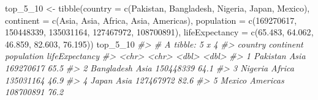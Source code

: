 \documentclass[
]{book}
\newenvironment{Shaded}{\begin{snugshade}}{\end{snugshade}}
\newcommand{\AttributeTok}[1]{\textcolor[rgb]{0.77,0.63,0.00}{#1}}
\newcommand{\CommentTok}[1]{\textcolor[rgb]{0.56,0.35,0.01}{\textit{#1}}}
\newcommand{\DecValTok}[1]{\textcolor[rgb]{0.00,0.00,0.81}{#1}}
\newcommand{\FloatTok}[1]{\textcolor[rgb]{0.00,0.00,0.81}{#1}}
\newcommand{\FunctionTok}[1]{\textcolor[rgb]{0.00,0.00,0.00}{#1}}
\newcommand{\NormalTok}[1]{#1}
\newcommand{\OtherTok}[1]{\textcolor[rgb]{0.56,0.35,0.01}{#1}}
\newcommand{\StringTok}[1]{\textcolor[rgb]{0.31,0.60,0.02}{#1}}
\begin{document}
\begin{Shaded}
\begin{Highlighting}[]
\NormalTok{top\_5\_10 }\OtherTok{\textless{}{-}} \FunctionTok{tibble}\NormalTok{(}\AttributeTok{country =} \FunctionTok{c}\NormalTok{(}\StringTok{\textquotesingle{}Pakistan\textquotesingle{}}\NormalTok{, }\StringTok{\textquotesingle{}Bangladesh\textquotesingle{}}\NormalTok{, }\StringTok{\textquotesingle{}Nigeria\textquotesingle{}}\NormalTok{, }\StringTok{\textquotesingle{}Japan\textquotesingle{}}\NormalTok{, }\StringTok{\textquotesingle{}Mexico\textquotesingle{}}\NormalTok{),}
                   \AttributeTok{continent =} \FunctionTok{c}\NormalTok{(}\StringTok{\textquotesingle{}Asia\textquotesingle{}}\NormalTok{, }\StringTok{\textquotesingle{}Asia\textquotesingle{}}\NormalTok{, }\StringTok{\textquotesingle{}Africa\textquotesingle{}}\NormalTok{, }\StringTok{\textquotesingle{}Asia\textquotesingle{}}\NormalTok{, }\StringTok{\textquotesingle{}Americas\textquotesingle{}}\NormalTok{),}
                   \AttributeTok{population =} \FunctionTok{c}\NormalTok{(}\DecValTok{169270617}\NormalTok{, }\DecValTok{150448339}\NormalTok{, }\DecValTok{135031164}\NormalTok{, }\DecValTok{127467972}\NormalTok{, }\DecValTok{108700891}\NormalTok{),}
                   \AttributeTok{lifeExpectancy =} \FunctionTok{c}\NormalTok{(}\FloatTok{65.483}\NormalTok{, }\FloatTok{64.062}\NormalTok{, }\FloatTok{46.859}\NormalTok{, }\FloatTok{82.603}\NormalTok{, }\FloatTok{76.195}\NormalTok{))}
\NormalTok{top\_5\_10}
\CommentTok{\#\textgreater{} \# A tibble: 5 x 4}
\CommentTok{\#\textgreater{}   country    continent population lifeExpectancy}
\CommentTok{\#\textgreater{}   \textless{}chr\textgreater{}      \textless{}chr\textgreater{}          \textless{}dbl\textgreater{}          \textless{}dbl\textgreater{}}
\CommentTok{\#\textgreater{} 1 Pakistan   Asia       169270617           65.5}
\CommentTok{\#\textgreater{} 2 Bangladesh Asia       150448339           64.1}
\CommentTok{\#\textgreater{} 3 Nigeria    Africa     135031164           46.9}
\CommentTok{\#\textgreater{} 4 Japan      Asia       127467972           82.6}
\CommentTok{\#\textgreater{} 5 Mexico     Americas   108700891           76.2}


\end{Highlighting}
\end{Shaded}
\end{document}
